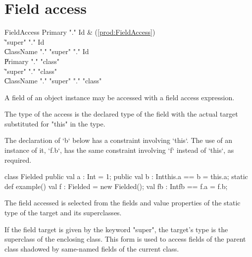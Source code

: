 \section{Field access}
\label{FieldAccess}

\begin{bbgrammar}
         FieldAccess \: Primary \xcd"." Id & (\ref{prod:FieldAccess}) \\
                    \| \xcd"super" \xcd"." Id \\
                    \| ClassName \xcd"." \xcd"super"  \xcd"." Id \\
                    \| Primary \xcd"." \xcd"class"  \\
                    \| \xcd"super" \xcd"." \xcd"class"  \\
                    \| ClassName \xcd"." \xcd"super"  \xcd"." \xcd"class"  \\
\end{bbgrammar}

A field of an object instance may be  accessed
with a field access expression.

The type of the access is the declared type of the field with the
actual target substituted for \xcd"this" in the type. 

\begin{ex}
The declaration of \xcd`b` below has a constraint involving \xcd`this`.  
The use of an instance of it, \xcd`f.b`, has the same constraint involving
\xcd`f` instead of \xcd`this`, as required.
\begin{xten}
class Fielded {
  public val a : Int = 1;
  public val b : Int{this.a == b} = this.a;
  static def example() {
    val f : Fielded = new Fielded();
    val fb : Int{fb == f.a} = f.b;
  }
}
\end{xten}
%

\end{ex}

The field accessed is selected from the fields and value properties
of the static type of the target and its superclasses.

If the field target is given by the keyword \xcd"super", the target's type is
the superclass of the enclosing class.  This form is used to access fields of
the parent class shadowed by same-named fields of the current class.

